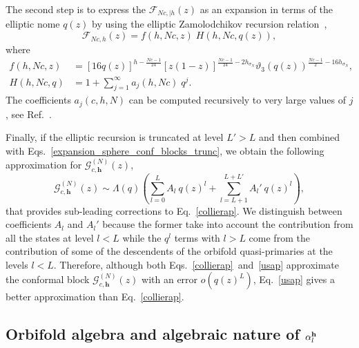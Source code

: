 \documentclass[a4paper,11pt]{article}
\begin{document}
The second step is to express the $\mathcal{F}_{N c, |h }(z)$ as an expansion in terms of the elliptic nome $q(z)$ by using the elliptic Zamolodchikov recursion relation~\cite{Zamolodchikov2},
\begin{equation}\label{zam_recursion}
 \mathcal{F}_{Nc, h}(z)=f(h, Nc, z) \;H(h, Nc, q(z)),
\end{equation}
where
\begin{align}
f(h, Nc, z) &= [16q(z)]^{h-\frac{Nc-1}{24}}
 [z(1-z)]^{\frac{Nc-1}{24}-2h_{\sigma_N}}
 \vartheta_3(q(z))^{\frac{Nc-1}{2}-16h_{\sigma_N}}, \\
 H(h, Nc, q)&=1+\sum_{j=1}^{\infty}a_j(h, Nc)\;q^j. \label{zam_H}
\end{align}
The coefficients $a_j(c, h,N)$ can be computed recursively to very large values of $j$, see Ref.~\cite{Zamolodchikov2}. 

Finally, if the elliptic recursion is truncated at level $L'>L$ and then combined 
with Eqs.~\eqref{expansion_sphere_conf_blocks_trunc}, we obtain the following approximation 
for $\mathcal{G}_{c, \boldsymbol{h}}^{(N)}(z)$, 
\begin{equation}
\label{usap}
\mathcal{G}_{c,\boldsymbol{h}}^{(N)}(z) \sim \Lambda(q) \left(\sum_{l=0}^{L} A_l~q(z)^l+\sum_{l=L+1}^{L+L'} A_l'~q(z)^{l}\right), 
\end{equation}
that provides sub-leading corrections to Eq.~\eqref{collierap}. We distinguish between coefficients 
$A_l$ and $A_l'$ because the former take into account the contribution from all the states at level $l<L$
while the $q^l$ terms with $l>L$ come from the contribution of some of the descendents of the orbifold 
quasi-primaries at the levels $l<L$. Therefore, although both Eqs.~\eqref{collierap}~and~\eqref{usap} 
approximate the conformal block $ \mathcal{G}_{c,\boldsymbol{h}}^{(N)}(z)$ with an error $o(q(z)^{L})$, 
Eq.~\eqref{usap} gives a better approximation than Eq.~\eqref{collierap}.  

\subsection{Orbifold algebra and algebraic nature of $\alpha_l^{{\bf h}}$}\label{deralpha}
\end{document}
